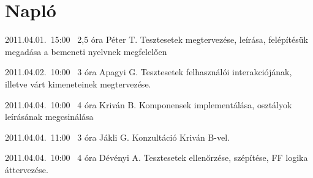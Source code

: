%
\section{Napló}

\begin{naplo}

\bejegyzes
{2011.04.01.~15:00~} %
{2,5 óra} %
{Péter T.\newline
}%
{Tesztesetek megtervezése, leírása, felépítésük megadása a bemeneti nyelvnek megfelelően} %

\bejegyzes
{2011.04.02.~10:00~} %
{3 óra} %
{Apagyi G.\newline
}%
{Tesztesetek felhasználói interakciójának, illetve várt kimeneteinek megtervezése.} %


\bejegyzes
{2011.04.04.~10:00~}
{4 óra}
{Kriván B.}
{Komponensek implementálása, osztályok leírásának megcsinálása}

\bejegyzes
{2011.04.04.~11:00~}
{3 óra}
{Jákli G.}
{Konzultáció Kriván B-vel.}

\bejegyzes
{2011.04.04.~10:00~}
{4 óra}
{Dévényi A.}
{Tesztesetek ellenőrzése, szépítése, FF logika áttervezése.}

\end{naplo}

